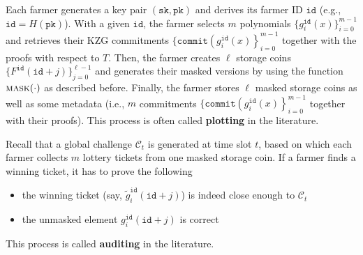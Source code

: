 \documentclass[12pt,draftcls,onecolumn]{IEEEtran}
\newcommand{\sk}{\texttt{sk}}
\newcommand{\pk}{\texttt{pk}}
\newcommand{\id}{\texttt{id}}
\newcommand{\cmt}{\texttt{commit}}
\newcommand{\mask}{\textsc{mask}}
\begin{document}
Each farmer generates a key pair $(\sk, \pk)$ and derives its farmer ID $\id$ (e.g., $\id = H(\pk)$).
With a given $\id$, the farmer selects $m$ polynomials $\{g_i^{\id}(x) \}_{i = 0}^{m - 1}$ and retrieves their KZG commitments $\{\cmt\left(g_i^{\id}(x) \right \}_{i = 0}^{m - 1}$
together with the proofs with respect to $T$. Then, the farmer creates $\ell$ storage coins 
$\{ F^{\id}(\id + j) \}_{j = 0}^{\ell - 1}$ and generates their masked versions by using the function $\mask(\cdot)$ as described before.
Finally, the farmer stores $\ell$ masked storage coins as well as some metadata (i.e., $m$ commitments $\{\cmt\left(g_i^{\id}(x) \right \}_{i = 0}^{m - 1}$ together with their proofs).
This process is often called {\bf plotting} in the literature.

Recall that a global challenge $\mathcal{C}_t$ is generated at time slot $t$, based on which each farmer collects $m$ lottery tickets from one masked storage coin. If a farmer finds a winning ticket, it has to prove the following
\begin{itemize}
    \item the winning ticket (say, $\tilde{g}_i^{\id}(\id + j)$) is indeed close enough to $\mathcal{C}_t$
    \item the unmasked element ${g}_i^{\id}(\id + j)$ is correct
\end{itemize}
This process is called {\bf auditing} in the literature. 




\end{document}
